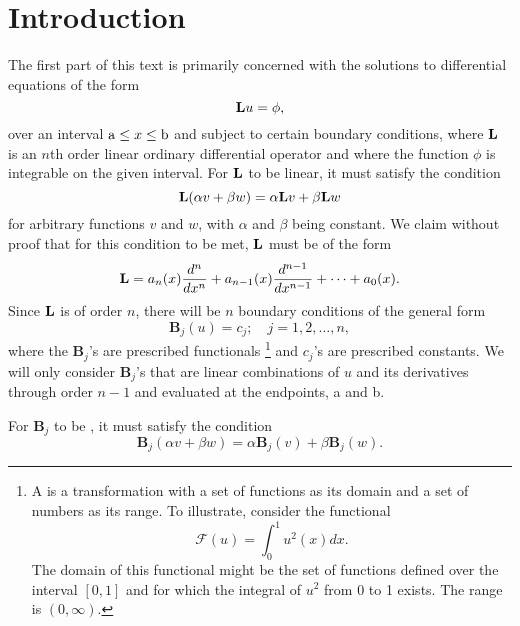 \section{Introduction}
The first part of this text is primarily concerned with the solutions to differential equations of the form
\begin{equation}
    \mathrm{\bf{L}} u=\phi,
\end{equation}
over an interval \(\mathrm{a} \leq x \leq \mathrm{b}\) and subject to certain boundary conditions, where \(\mathrm{\bf{L}}\) is an \(n\)th order linear ordinary differential operator and where the function \(\phi\) is integrable on the given interval. For \(\mathrm{\bf{L}}\) to be linear, it must satisfy the condition
\begin{equation}
	\mathrm{\bf{L}}(\alpha v + \beta w) = \alpha \mathrm{\bf{L}} v + \beta \mathrm{\bf{L}} w
\end{equation}
for arbitrary functions \(v\) and \(w\), with \(\alpha\) and \(\beta\) being constant. We claim without proof that for this condition to be met, \(\mathrm{\bf{L}}\) must be of the form
\begin{equation} 
	\mathrm{\bf{L}} = a_n(x) \frac{d^n}{dx^n} + a_{n-1}(x) \frac{d^{n-1}}{dx^{n-1}} + \cdots + a_0(x).
\end{equation}
	Since \(\mathrm{\bf{L}}\) is of order \(n\), there will be \(n\) boundary conditions of the general form 
\begin{equation}
	\mathbf{B}_j (u) = c_j;\quad j=1,2,\dots,n,
\end{equation}
where the \(\mathbf{B}_j\)'s are prescribed functionals \footnote{A  is a transformation with a set of functions as its domain and a set of numbers as its range. To illustrate, consider the functional 
\begin{equation}
	\mathcal{F}(u) = \int_{0}^{1} u^2(x)dx.
\end{equation}
The domain of this functional might be the set of functions defined over the interval \([0,1]\) and for which the integral of \(u^2\) from 0 to 1 exists. The range is \((0, \infty)\).
} and \(c_j\)'s are prescribed constants. We will only consider \(\mathbf{B}_j\)'s that are linear combinations of \(u\) and its derivatives through order \(n-1\) and evaluated at the endpoints, a and b. 

For \(\mathbf{B}_j\) to be , it must satisfy the condition
\begin{equation}
	\mathbf{B}_j(\alpha v + \beta w) = \alpha \mathbf{B}_j (v) + \beta \mathbf{B}_j(w).
\end{equation}